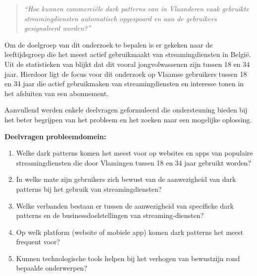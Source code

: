 \vspace{1em}

\begin{quote}    
    \textit{``Hoe kunnen commerciële dark patterns van in Vlaanderen vaak gebruikte streamingdiensten automatisch opgespoord en aan de gebruikers gesignaleerd worden?''}
\end{quote}

\vspace{1em}

Om de doelgroep van dit onderzoek te bepalen is er gekeken naar de leeftijdsgroep die het meest actief gebruikmaakt van streamingdiensten in België. Uit de statistieken van \textcite{StatistiekVlaanderen2025} blijkt dat dit vooral jongvolwassenen zijn tussen 18 en 34 jaar. Hierdoor ligt de focus voor dit onderzoek op Vlaamse gebruikers tussen 18 en 34 jaar die actief gebruikmaken van streamingdiensten en interesse tonen in het afsluiten van een abonnement.

\vspace{1em}

Aanvullend werden enkele deelvragen geformuleerd die ondersteuning bieden bij het beter begrijpen van het probleem en het zoeken naar een mogelijke oplossing.

\vspace{1em}

\noindent
\textbf{Deelvragen probleemdomein:}
\begin{enumerate}
    \item Welke dark patterns komen het meest voor op websites en apps van populaire streamingdiensten die door Vlamingen tussen 18 en 34 jaar gebruikt worden?
    \item In welke mate zijn gebruikers zich bewust van de aanwezigheid van dark patterns bij het gebruik van streamingdiensten?
    \item Welke verbanden bestaan er tussen de aanwezigheid van specifieke dark patterns en de businessdoelstellingen van streaming-\newline diensten?
    \item Op welk platform (website of mobiele app) komen dark patterns het meest frequent voor?
    \item Kunnen technologische tools helpen bij het verhogen van bewustzijn rond bepaalde onderwerpen?
\end{enumerate}

